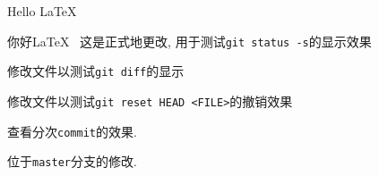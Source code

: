 \documentclass{ctexart}
\begin{document}
    Hello \LaTeX~

    你好\LaTeX~ %
    这是正式地更改, 用于测试\verb|git status -s|的显示效果

    修改文件以测试\verb|git diff|的显示

    修改文件以测试\verb|git reset HEAD <FILE>|的撤销效果

    查看分次\verb|commit|的效果. 

    位于\verb|master|分支的修改. 
\end{document}
